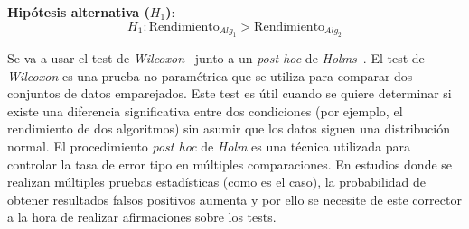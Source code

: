 \textbf{Hipótesis alternativa (\(H_1\))}:
\begin{equation}
    H_1: \text{Rendimiento}_{Alg_1} > \text{Rendimiento}_{Alg_2}
\end{equation}

Se va a usar el test de \textit{Wilcoxon}~\cite{Rey2011} junto a un \textit{post hoc} de \textit{Holms}~\cite{holm1979simple}. El test de \textit{Wilcoxon} es una prueba no paramétrica que se utiliza para comparar dos conjuntos de datos emparejados. Este test es útil cuando se quiere determinar si existe una diferencia significativa entre dos condiciones (por ejemplo, el rendimiento de dos algoritmos) sin asumir que los datos siguen una distribución normal. El procedimiento \textit{post hoc} de \textit{Holm} es una técnica utilizada para controlar la tasa de error tipo en múltiples comparaciones. En estudios donde se realizan múltiples pruebas estadísticas (como es el caso), la probabilidad de obtener resultados falsos positivos aumenta y por ello se necesite de este corrector a la hora de realizar afirmaciones sobre los tests.